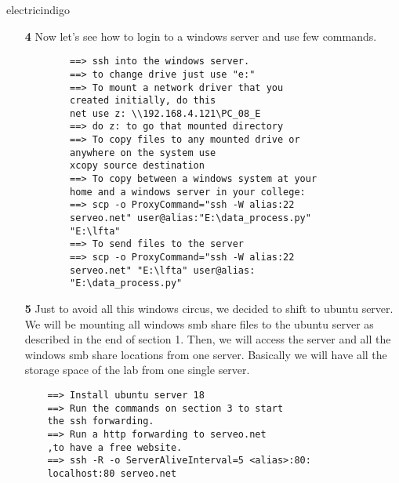 \documentclass[12pt]{article}
\begin{document}
\begin{mybox}{electricindigo}{}
	\begin{itemize}
		\item[\textbf{4}] Now let's see how to login to a windows server and use few commands.
		\begin{lstlisting}
		==> ssh into the windows server.
		==> to change drive just use "e:"
		==> To mount a network driver that you
		created initially, do this
		net use z: \\192.168.4.121\PC_08_E
		==> do z: to go that mounted directory
		==> To copy files to any mounted drive or
		anywhere on the system use
		xcopy source destination
		==> To copy between a windows system at your 
		home and a windows server in your college:
		==> scp -o ProxyCommand="ssh -W alias:22 
		serveo.net" user@alias:"E:\data_process.py" 
		"E:\lfta"
		==> To send files to the server
		==> scp -o ProxyCommand="ssh -W alias:22 
		serveo.net" "E:\lfta" user@alias:
		"E:\data_process.py"
		\end{lstlisting}
	\item[\textbf{5}] Just to avoid all this windows circus, we decided to shift to ubuntu server. We will be mounting all windows smb share files to the ubuntu server as described in the end of section 1. Then, we will access the server and all the windows smb share locations from one server. Basically we will have all the storage space of the lab from one single server.
	\begin{lstlisting}
	==> Install ubuntu server 18
	==> Run the commands on section 3 to start
	the ssh forwarding.
	==> Run a http forwarding to serveo.net
	,to have a free website.
	==> ssh -R -o ServerAliveInterval=5 <alias>:80:
	localhost:80 serveo.net
	\end{lstlisting}
	
	\end{itemize}
\end{mybox}
\end{document}
